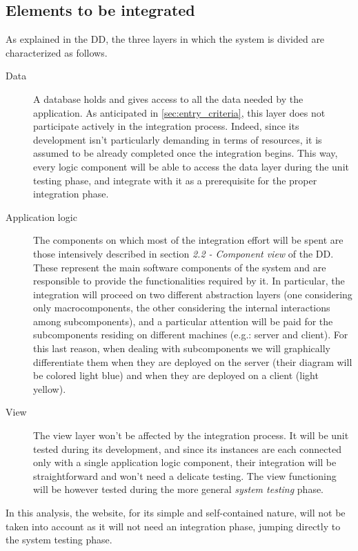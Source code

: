 \subsection{Elements to be integrated}
\label{sec:elements_to_be_integrated}
	As explained in the DD, the three layers in which the system is divided are characterized as follows.
	\begin{description}
		\item[Data] A database holds and gives access to all the data needed by the application. As anticipated in \autoref{sec:entry_criteria}, this layer does not participate actively in the integration process. Indeed, since its development isn't particularly demanding in terms of resources, it is assumed to be already completed once the integration begins. This way, every logic component will be able to access the data layer during the unit testing phase, and integrate with it as a prerequisite for the proper integration phase.
		\item[Application logic] The components on which most of the integration effort will be spent are those intensively described in section \textit{2.2 - Component view} of the DD. These represent the main software components of the system and are responsible to provide the functionalities required by it. In particular, the integration will proceed on two different abstraction layers (one considering only macrocomponents, the other considering the internal interactions among subcomponents), and a particular attention will be paid for the subcomponents residing on different machines (e.g.: server and client). For this last reason, when dealing with subcomponents we will graphically differentiate them when they are deployed on the server (their diagram will be colored light blue) and when they are deployed on a client (light yellow).
		\item[View] The view layer won't be affected by the integration process. It will be unit tested during its development, and since its instances are each connected only with a single application logic component, their integration will be straightforward and won't need a delicate testing. The view functioning will be however tested during the more general \textit{system testing} phase. %
	\end{description}
	In this analysis, the website, for its simple and self-contained nature, will not be taken into account as it will not need an integration phase, jumping directly to the system testing phase.	\newline


